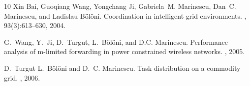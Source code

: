 \begin{thebibliography}{10}
Xin Bai, Guoqiang Wang, Yongchang Ji, Gabriela~M. Marinescu, Dan~C. Marinescu,
  and Ladislau B{\"o}l{\"o}ni.
\newblock Coordination in intelligent grid environments.
, 93(3):613--630, 2004.

G.~Wang, Y.~Ji, D.~Turgut, L.~B{\"o}l{\"o}ni, and D.C. Marinescu.
\newblock Performance analysis of m-limited forwarding in power constrained
  wireless networks.
, 2005.

D.~Turgut L.~B{\"o}l{\"o}ni and D.~C. Marinescu.
\newblock Task distribution on a commodity grid.
, 2006.

\end{thebibliography}
